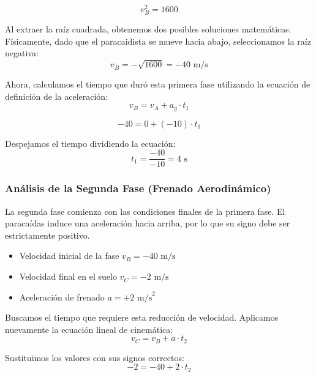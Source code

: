 \documentclass[12pt, a4paper]{article}
\begin{document}
\begin{equation}
v_B^2 = 1600
\end{equation}

Al extraer la raíz cuadrada, obtenemos dos posibles soluciones matemáticas. Físicamente, dado que el paracaidista se mueve hacia abajo, seleccionamos la raíz negativa:
\begin{equation}
v_B = -\sqrt{1600} = -40 \text{ m/s}
\end{equation}

Ahora, calculamos el tiempo que duró esta primera fase utilizando la ecuación de definición de la aceleración:
\begin{equation}
v_B = v_A + a_y \cdot t_1
\end{equation}

\begin{equation}
-40 = 0 + (-10) \cdot t_1
\end{equation}

Despejamos el tiempo dividiendo la ecuación:
\begin{equation}
t_1 = \frac{-40}{-10} = 4 \text{ s}
\end{equation}

\subsubsection*{Análisis de la Segunda Fase (Frenado Aerodinámico)}

La segunda fase comienza con las condiciones finales de la primera fase. El paracaídas induce una aceleración hacia arriba, por lo que su signo debe ser estrictamente positivo.

\begin{itemize}
    \item Velocidad inicial de la fase $v_B = -40 \text{ m/s}$
    \item Velocidad final en el suelo $v_C = -2 \text{ m/s}$
    \item Aceleración de frenado $a = +2 \text{ m/s}^2$
\end{itemize}

Buscamos el tiempo que requiere esta reducción de velocidad. Aplicamos nuevamente la ecuación lineal de cinemática:
\begin{equation}
v_C = v_B + a \cdot t_2
\end{equation}

Sustituimos los valores con sus signos correctos:
\begin{equation}
-2 = -40 + 2 \cdot t_2
\end{equation}
\end{document}
